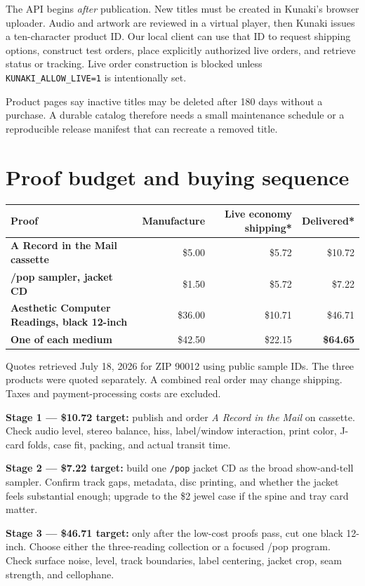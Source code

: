 \documentclass[11pt]{article}
\begin{document}
The API begins \emph{after} publication. New titles must be created in Kunaki's browser uploader. Audio and artwork are reviewed in a virtual player, then Kunaki issues a ten-character product ID. Our local client can use that ID to request shipping options, construct test orders, place explicitly authorized live orders, and retrieve status or tracking. Live order construction is blocked unless \texttt{KUNAKI\_ALLOW\_LIVE=1} is intentionally set.

Product pages say inactive titles may be deleted after 180 days without a purchase. A durable catalog therefore needs a small maintenance schedule or a reproducible release manifest that can recreate a removed title.

\clearpage
\section*{Proof budget and buying sequence}

\begin{tabularx}{\textwidth}{>{\bfseries}X r r r}
\toprule
Proof & Manufacture & Live economy shipping* & Delivered* \\
\midrule
A Record in the Mail cassette & \$5.00 & \$5.72 & \$10.72 \\
/pop sampler, jacket CD & \$1.50 & \$5.72 & \$7.22 \\
Aesthetic Computer Readings, black 12-inch & \$36.00 & \$10.71 & \$46.71 \\
\midrule
One of each medium & \$42.50 & \$22.15 & \textbf{\$64.65} \\
\bottomrule
\end{tabularx}

{\small *Quotes retrieved July 18, 2026 for ZIP 90012 using public sample IDs. The three products were quoted separately. A combined real order may change shipping. Taxes and payment-processing costs are excluded.}

\textbf{Stage 1 --- \$10.72 target:} publish and order \textit{A Record in the Mail} on cassette. Check audio level, stereo balance, hiss, label/window interaction, print color, J-card folds, case fit, packing, and actual transit time.

\textbf{Stage 2 --- \$7.22 target:} build one \texttt{/pop} jacket CD as the broad show-and-tell sampler. Confirm track gaps, metadata, disc printing, and whether the jacket feels substantial enough; upgrade to the \$2 jewel case if the spine and tray card matter.

\textbf{Stage 3 --- \$46.71 target:} only after the low-cost proofs pass, cut one black 12-inch. Choose either the three-reading collection or a focused /pop program. Check surface noise, level, track boundaries, label centering, jacket crop, seam strength, and cellophane.
\end{document}
